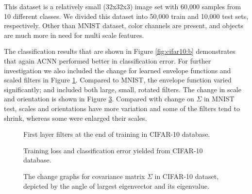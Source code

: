 \documentclass{bmvc2k}
\begin{document}
This dataset \cite{cifar10} is a relatively small (32x32x3) image set with 60,000 samples from 10 different classes. We divided this dataset into 50,000 train and 10,000 test sets, respectively. Other than MNIST dataset, color channels are present, and objects are much more in need for multi scale features.

The classification results that are shown in Figure \ref{fig:cifar10:b} demonstrates that again ACNN performed better in classification error. For further investigation we also included the change for learned envelope functions and scaled filters in Figure \ref{fig:cifar10:filter1}. Compared to MNIST, the envelope function varied significantly; and included both large, small, rotated filters. The change in scale and orientation is shown in Figure \ref{fig:cifar:convchange}. Compared with change on $\Sigma$ in MNIST test, scales and orientations have more variation and some of the filters tend to shrink, whereas some were enlarged their scales.

\begin{figure}
	\centering
	\caption{First layer filters at the end of training in CIFAR-10 database.}
	\label{fig:cifar10:filter1}
\end{figure}

\begin{figure}
	\centering     %
	
	
	\caption{Training loss and classification error yielded from CIFAR-10 database.}
	\label{fig:cifar10:results}
\end{figure}

\begin{figure}
	\centering
	\caption{The change graphs for covariance matrix $\Sigma$ in CIFAR-10 dataset, depicted by the angle of largest eigenvector and its eigenvalue.}
	\label{fig:cifar:convchange}
\end{figure}
\end{document}
